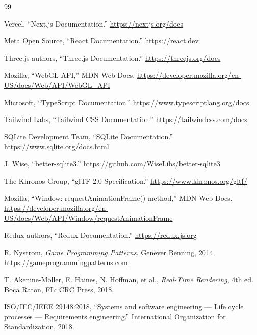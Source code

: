 \documentclass[12pt,a4paper]{report}
\begin{document}
\renewcommand{\bibname}{References}
{}
\begin{thebibliography}{99}

 Vercel, ``Next.js Documentation.'' \url{https://nextjs.org/docs}

 Meta Open Source, ``React Documentation.'' \url{https://react.dev}

 Three.js authors, ``Three.js Documentation.''
\url{https://threejs.org/docs}

 Mozilla, ``WebGL API,'' MDN Web Docs.
\url{https://developer.mozilla.org/en-US/docs/Web/API/WebGL_API}

 Microsoft, ``TypeScript Documentation.''
\url{https://www.typescriptlang.org/docs}

 Tailwind Labs, ``Tailwind CSS Documentation.''
\url{https://tailwindcss.com/docs}

 SQLite Development Team, ``SQLite Documentation.''
\url{https://www.sqlite.org/docs.html}

 J. Wise, ``better-sqlite3.''
\url{https://github.com/WiseLibs/better-sqlite3}

 The Khronos Group, ``glTF 2.0 Specification.''
\url{https://www.khronos.org/gltf/}

 Mozilla, ``Window: requestAnimationFrame() method,'' MDN Web Docs.
\url{https://developer.mozilla.org/en-US/docs/Web/API/Window/requestAnimationFrame}

 Redux authors, ``Redux Documentation.'' \url{https://redux.js.org}

 R. Nystrom, \textit{Game Programming Patterns}. Genever
Benning, 2014. \url{https://gameprogrammingpatterns.com}

 T. Akenine-M\"oller, E. Haines, N. Hoffman, et al.,
\textit{Real-Time Rendering}, 4th ed. Boca Raton, FL: CRC Press, 2018.

 ISO/IEC/IEEE 29148:2018, ``Systems and software engineering
--- Life cycle processes --- Requirements engineering.'' International
Organization for Standardization, 2018.

\end{thebibliography}
\end{document}

